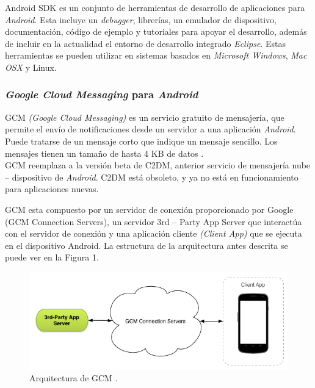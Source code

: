 Android SDK es un conjunto de herramientas de desarrollo de aplicaciones para \textit{Android}. Esta incluye un \textit{debugger}, librerías, un emulador de dispositivo, documentación, código de ejemplo y tutoriales para apoyar el desarrollo, además de incluir en la actualidad el entorno de desarrollo integrado \textit{Eclipse}. Estas herramientas se pueden utilizar en sistemas basados en \textit{Microsoft Windows}, \textit{Mac OSX} y Linux.\\

\subsubsection{\textit{Google Cloud Messaging} para \textit{Android}}

GCM \textit{(Google Cloud Messaging)} es un servicio gratuito de mensajería, que permite el envío de notificaciones desde un servidor a una aplicación \textit{Android}. Puede tratarse de un mensaje corto que indique un mensaje sencillo. Los mensajes tienen un tamaño de hasta 4 KB de datos \cite{And14}.\\
GCM reemplaza a la versión beta de C2DM, anterior servicio de mensajería nube – dispositivo de \textit{Android}. C2DM está obsoleto, y ya no está en funcionamiento para aplicaciones nuevas.\\


GCM esta compuesto por un servidor de conexión proporcionado por Google (GCM Connection Servers), un servidor 3rd – Party App Server que interactúa con el servidor de conexión y una aplicación cliente \textit{(Client App)} que se ejecuta en el dispositivo Android. La estructura de la arquitectura antes descrita se puede ver en la Figura 1.\\

\begin{figure}[H]
\centering
\includegraphics[scale=0.65]{images/capitulo2/GCM_arquitectura.png}
\caption{Arquitectura de GCM \cite{And14}.}
\label{iot}
\end{figure}

